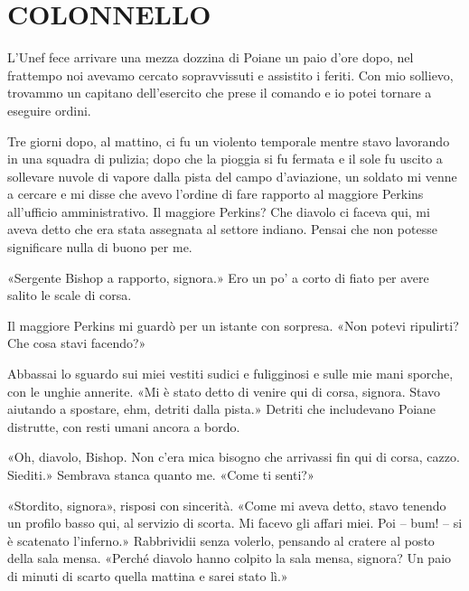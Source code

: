 \chapter{COLONNELLO}\label{colonnello}

\hfill\break

L'Unef fece arrivare una mezza dozzina di Poiane un paio d'ore dopo, nel
frattempo noi avevamo cercato sopravvissuti e assistito i feriti. Con
mio sollievo, trovammo un capitano dell'esercito che prese il comando e
io potei tornare a eseguire ordini.

Tre giorni dopo, al mattino, ci fu un violento temporale mentre stavo
lavorando in una squadra di pulizia; dopo che la pioggia si fu fermata e
il sole fu uscito a sollevare nuvole di vapore dalla pista del campo
d'aviazione, un soldato mi venne a cercare e mi disse che avevo l'ordine
di fare rapporto al maggiore Perkins all'ufficio amministrativo. Il
maggiore Perkins? Che diavolo ci faceva qui, mi aveva detto che era
stata assegnata al settore indiano. Pensai che non potesse significare
nulla di buono per me.

«Sergente Bishop a rapporto, signora.» Ero un po' a corto di fiato per
avere salito le scale di corsa.

Il maggiore Perkins mi guardò per un istante con sorpresa. «Non potevi
ripulirti? Che cosa stavi facendo?»

Abbassai lo sguardo sui miei vestiti sudici e fuligginosi e sulle mie
mani sporche, con le unghie annerite. «Mi è stato detto di venire qui di
corsa, signora. Stavo aiutando a spostare, ehm, detriti dalla pista.»
Detriti che includevano Poiane distrutte, con resti umani ancora a
bordo.

«Oh, diavolo, Bishop. Non c'era mica bisogno che arrivassi fin qui di
corsa, cazzo. Siediti.» Sembrava stanca quanto me. «Come ti senti?»

«Stordito, signora», risposi con sincerità. «Come mi aveva detto, stavo
tenendo un profilo basso qui, al servizio di scorta. Mi facevo gli
affari miei. Poi -- bum! -- si è scatenato l'inferno.» Rabbrividii senza
volerlo, pensando al cratere al posto della sala mensa. «Perché diavolo
hanno colpito la sala mensa, signora? Un paio di minuti di scarto quella
mattina e sarei stato lì.»

